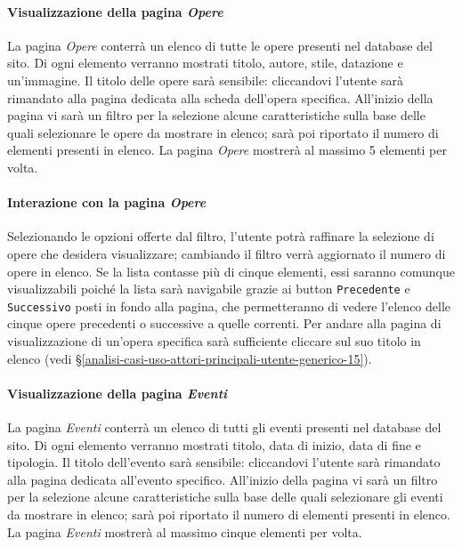 \paragraph{Visualizzazione della pagina \textit{Opere}}
\label{analisi-casi-uso-attori-principali-utente-generico-4}
La pagina \textit{Opere} conterrà un elenco di tutte le opere presenti nel database del sito. Di ogni elemento verranno mostrati titolo, autore, stile, datazione e un'immagine. Il titolo delle opere sarà sensibile: cliccandovi l'utente sarà rimandato alla pagina dedicata alla scheda dell'opera specifica. All'inizio della pagina vi sarà un filtro per la selezione alcune caratteristiche sulla base delle quali selezionare le opere da mostrare in elenco; sarà poi riportato il numero di elementi presenti in elenco. La pagina \textit{Opere} mostrerà al massimo 5 elementi per volta.

\paragraph{Interazione con la pagina \textit{Opere}}
\label{analisi-casi-uso-attori-principali-utente-generico-5}
Selezionando le opzioni offerte dal filtro, l'utente potrà raffinare la selezione di opere che desidera visualizzare; cambiando il filtro verrà aggiornato il numero di opere in elenco. Se la lista contasse più di cinque elementi, essi saranno comunque visualizzabili poiché la lista sarà navigabile grazie ai button \texttt{Precedente} e \texttt{Successivo} posti in fondo alla pagina, che permetteranno di vedere l'elenco delle cinque opere precedenti o successive a quelle correnti. Per andare alla pagina di visualizzazione di un'opera specifica sarà sufficiente cliccare sul suo titolo in elenco (vedi §\ref{analisi-casi-uso-attori-principali-utente-generico-15}).

\paragraph{Visualizzazione della pagina \textit{Eventi}}
\label{analisi-casi-uso-attori-principali-utente-generico-6}
La pagina \textit{Eventi} conterrà un elenco di tutti gli eventi presenti nel database del sito. Di ogni elemento verranno mostrati titolo, data di inizio, data di fine e tipologia. Il titolo dell'evento sarà sensibile: cliccandovi l'utente sarà rimandato alla pagina dedicata all'evento specifico. All'inizio della pagina vi sarà un filtro per la selezione alcune caratteristiche sulla base delle quali selezionare gli eventi da mostrare in elenco; sarà poi riportato il numero di elementi presenti in elenco. La pagina \textit{Eventi} mostrerà al massimo cinque elementi per volta.

